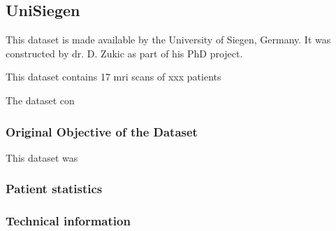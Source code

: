 
\subsection{UniSiegen}

This dataset is made available by the University of Siegen, Germany.
It was constructed by dr. D. Zukic \cite{Zukic2014} as part of his PhD project.

This dataset contains 17 \acrshort{mri} scans of xxx patients

The dataset con

\subsubsection{Original Objective of the Dataset}

This dataset was 

\subsubsection{Patient statistics}



\subsubsection{Technical information}


